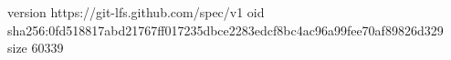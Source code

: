 version https://git-lfs.github.com/spec/v1
oid sha256:0fd518817abd21767ff017235dbce2283edcf8bc4ac96a99fee70af89826d329
size 60339

